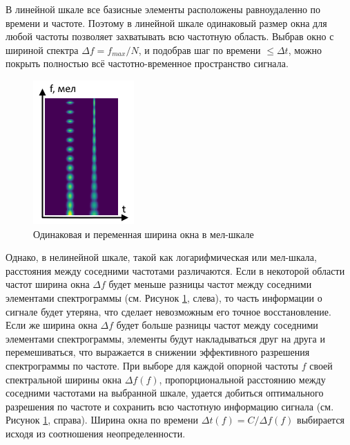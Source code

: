 В линейной шкале все базисные элементы расположены равноудаленно по времени и частоте. 
Поэтому в линейной шкале одинаковый размер окна для любой частоты позволяет захватывать всю частотную область.
Выбрав окно с шириной спектра $\Delta f = f_{max} / N$, и подобрав шаг
по времени $\leq \Delta t$, можно покрыть полностью всё частотно-временное пространство сигнала.

\begin{figure}
  \includegraphics[width=0.9\linewidth]{figures/windows_mel}
  \caption{Одинаковая и переменная ширина окна в мел-шкале}
  \label{fig:windows_mel}
\end{figure}

Однако, в нелинейной шкале, такой как логарифмическая или мел-шкала, расстояния между соседними частотами различаются. 
Если в некоторой области частот ширина окна $\Delta f$ будет меньше разницы частот между соседними элементами спектрограммы (см. Рисунок \ref{fig:windows_mel}, слева),
то часть информации о сигнале будет утеряна, что сделает невозможным его точное восстановление.
Если же ширина окна $\Delta f$ будет больше разницы частот между соседними элементами спектрограммы, 
элементы будут накладываться друг на друга и перемешиваться,
что выражается в снижении эффективного разрешения спектрограммы по частоте.
При выборе для каждой опорной частоты $f$ своей спектральной ширины окна $\Delta f(f)$, пропорциональной расстоянию между соседними частотами на выбранной шкале, 
удается добиться оптимального разрешения по частоте и сохранить всю частотную информацию сигнала (см. Рисунок \ref{fig:windows_mel}, справа). 
Ширина окна по времени $\Delta t(f) = C / \Delta f(f)$ выбирается исходя из соотношения неопределенности.

